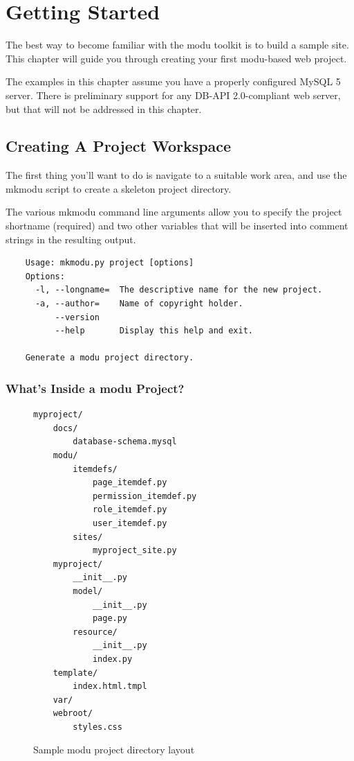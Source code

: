 \chapter{Getting Started}

The best way to become familiar with the modu toolkit is to build a sample
site. This chapter will guide you through creating your first modu-based
web project.

The examples in this chapter assume you have a properly configured MySQL 5
server. There is preliminary support for any DB-API 2.0-compliant web server,
but that will not be addressed in this chapter.

\section{Creating A Project Workspace}

The first thing you'll want to do is navigate to a suitable work area, and
use the mkmodu script to create a skeleton project directory.

The various mkmodu command line arguments allow you to specify the project
shortname (required) and two other variables that will be inserted into
comment strings in the resulting output.

\begin{verbatim}
    Usage: mkmodu.py project [options]
    Options:
      -l, --longname=  The descriptive name for the new project.
      -a, --author=    Name of copyright holder.
          --version    
          --help       Display this help and exit.

    Generate a modu project directory.
\end{verbatim}

\subsection{What's Inside a modu Project?}

\begin{figure}[ht]
\label{layout}
\caption{Sample modu project directory layout}
\begin{verbatim}
myproject/
    docs/
        database-schema.mysql
    modu/
        itemdefs/
            page_itemdef.py
            permission_itemdef.py
            role_itemdef.py
            user_itemdef.py
        sites/
            myproject_site.py
    myproject/
        __init__.py
        model/
            __init__.py
            page.py
        resource/
            __init__.py
            index.py
    template/
        index.html.tmpl
    var/
    webroot/
        styles.css
\end{verbatim}
\end{figure}

